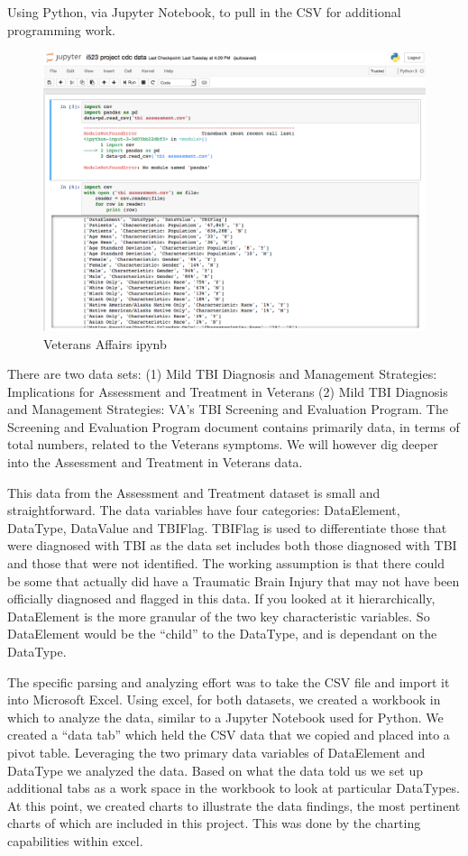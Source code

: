 \documentclass[sigconf]{acmart}
\begin{document}
Using Python, via Jupyter Notebook, to pull in the CSV for additional programming work.


\begin{figure}[h]
\includegraphics[width=\columnwidth]{images/graph4.png}
\caption{Veterans Affairs ipynb}\label{f:Veterans Affairs ipynb}
\end{figure}

There are two data sets: (1) Mild TBI Diagnosis and Management Strategies: Implications for Assessment and Treatment in Veterans (2) Mild TBI Diagnosis and Management Strategies: VA's TBI Screening and Evaluation Program. The Screening and Evaluation Program document contains primarily data, in terms of total numbers, related to the Veterans symptoms.  We will however dig deeper into the Assessment and Treatment in Veterans data.

This data from the Assessment and Treatment dataset is small and straightforward.  The data variables have four categories: DataElement, DataType, DataValue and TBIFlag.  TBIFlag is used to differentiate those that were diagnosed with TBI as the data set includes both those diagnosed with TBI and those that were not identified.  The working assumption is that there could be some that actually did have a Traumatic Brain Injury that may not have been officially diagnosed and flagged in this data. If you looked at it hierarchically, DataElement is the more granular of the two key characteristic variables.  So DataElement would be the ``child'' to the DataType, and is dependant on the DataType. 

The specific parsing and analyzing effort was to take the CSV file and import it into Microsoft Excel.  Using excel, for both datasets, we created a workbook in which to analyze the data, similar to a Jupyter Notebook used for Python.  We created a ``data tab'' which held the CSV data that we copied and placed into a pivot table.  Leveraging the two primary data variables of DataElement and DataType we analyzed the data.  Based on what the data told us we set up additional tabs as a work space in the workbook to look at particular DataTypes.  At this point, we created charts to illustrate the data findings, the most pertinent charts of which are included in this project.  This was done by the charting capabilities within excel.
\end{document}

